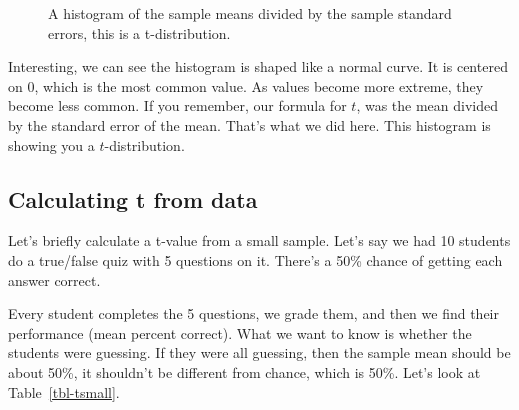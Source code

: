 \documentclass[
  letterpaper,
  DIV=11,
  numbers=noendperiod]{scrreprt}
\begin{document}
\begin{figure}


\caption{\label{fig-7thisexample}A histogram of the sample means divided
by the sample standard errors, this is a t-distribution.}

\end{figure}%

Interesting, we can see the histogram is shaped like a normal curve. It
is centered on 0, which is the most common value. As values become more
extreme, they become less common. If you remember, our formula for
\(t\), was the mean divided by the standard error of the mean. That's
what we did here. This histogram is showing you a \(t\)-distribution.

\subsection{Calculating t from data}\label{calculating-t-from-data}

Let's briefly calculate a t-value from a small sample. Let's say we had
10 students do a true/false quiz with 5 questions on it. There's a 50\%
chance of getting each answer correct.

Every student completes the 5 questions, we grade them, and then we find
their performance (mean percent correct). What we want to know is
whether the students were guessing. If they were all guessing, then the
sample mean should be about 50\%, it shouldn't be different from chance,
which is 50\%. Let's look at Table~\ref{tbl-tsmall}.
\end{document}
